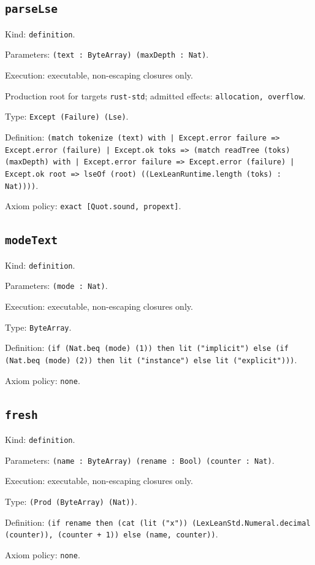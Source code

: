 \documentclass[11pt]{article}
\begin{document}
\subsection*{\texttt{parseLse}}
\noindent Kind: \texttt{definition}.\par
\noindent Parameters: \texttt{(text : ByteArray) (maxDepth : Nat)}.\par
\noindent Execution: executable, non-escaping closures only.\par
\noindent Production root for targets \texttt{rust-std}; admitted effects: \texttt{allocation, overflow}.\par
\noindent Type: \texttt{Except (Failure) (Lse)}.\par
\noindent Definition: \texttt{(match tokenize (text) with | Except.error failure => Except.error (failure) | Except.ok toks => (match readTree (toks) (maxDepth) with | Except.error failure => Except.error (failure) | Except.ok root => lseOf (root) ((LexLeanRuntime.length (toks) : Nat))))}.\par
\noindent Axiom policy: \texttt{exact [Quot.sound, propext]}.\par
\subsection*{\texttt{modeText}}
\noindent Kind: \texttt{definition}.\par
\noindent Parameters: \texttt{(mode : Nat)}.\par
\noindent Execution: executable, non-escaping closures only.\par
\noindent Type: \texttt{ByteArray}.\par
\noindent Definition: \texttt{(if (Nat.beq (mode) (1)) then lit ("implicit") else (if (Nat.beq (mode) (2)) then lit ("instance") else lit ("explicit")))}.\par
\noindent Axiom policy: \texttt{none}.\par
\subsection*{\texttt{fresh}}
\noindent Kind: \texttt{definition}.\par
\noindent Parameters: \texttt{(name : ByteArray) (rename : Bool) (counter : Nat)}.\par
\noindent Execution: executable, non-escaping closures only.\par
\noindent Type: \texttt{(Prod (ByteArray) (Nat))}.\par
\noindent Definition: \texttt{(if rename then (cat (lit ("x")) (LexLeanStd.Numeral.decimal (counter)), (counter + 1)) else (name, counter))}.\par
\noindent Axiom policy: \texttt{none}.\par
\end{document}
